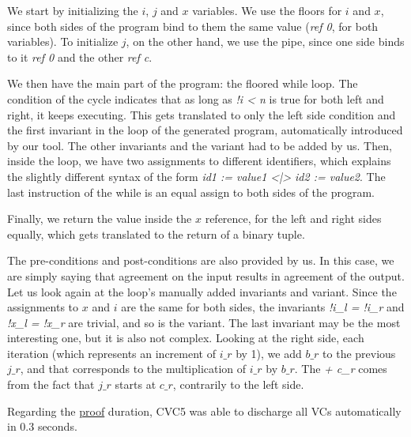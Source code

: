 We start by initializing the $i$, $j$ and $x$ variables.
We use the floors for $i$ and $x$, since both sides of the program bind to them the same value (\emph{ref 0}, for both variables).
To initialize $j$, on the other hand, we use the pipe, since one side binds to it \emph{ref 0} and the other \emph{ref c}.

We then have the main part of the program: the floored while loop.
The condition of the cycle indicates that as long as \emph{!i < n} is true for both left and right, it keeps executing.
This gets translated to only the left side condition and the first invariant in the loop of the generated program, automatically introduced by our tool.
The other invariants and the variant had to be added by us.
Then, inside the loop, we have two assignments to different identifiers, which explains the slightly different syntax of the form \emph{id1 := value1 <|> id2 := value2}.
The last instruction of the while is an equal assign to both sides of the program.

Finally, we return the value inside the $x$ reference, for the left and right sides equally, which gets translated to the return of a binary tuple.

The pre-conditions and post-conditions are also provided by us.
In this case, we are simply saying that agreement on the input results in agreement of the output.
Let us look again at the loop's manually added invariants and variant. 
Since the assignments to $x$ and $i$ are the same for both sides, the invariants \emph{!i\_l = !i\_r} and \emph{!x\_l = !x\_r} are trivial, and so is the variant.
The last invariant may be the most interesting one, but it is also not complex. 
Looking at the right side, each iteration (which represents an increment of $i\_r$ by 1), we add $b\_r$ to the previous $j\_r$, and that corresponds to the multiplication of $i\_r$ by $b\_r$.
The \emph{+ c\_r} comes from the fact that $j\_r$ starts at $c\_r$, contrarily to the left side.

Regarding the \hyperref[fig:ivsr-verif-res]{proof} duration, CVC5 was able to discharge all VCs automatically in 0.3 seconds.

